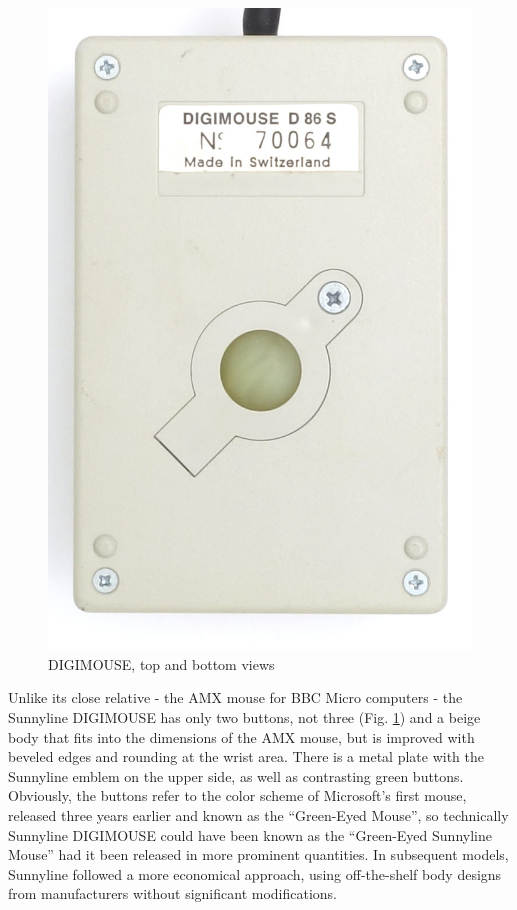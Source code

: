 \documentclass[11pt, a4paper]{article}
\begin{document}
\begin{figure}[h]
    \includegraphics[scale=0.85]{1986_sunnyline_digimouse/bottom_30.jpg}
    \caption{DIGIMOUSE, top and bottom views}
    \label{fig:SunnylineDIGIMOUSETopAndBottom}
\end{figure}

Unlike its close relative - the AMX mouse for BBC Micro computers - the Sunnyline DIGIMOUSE has only two buttons, not three (Fig. \ref{fig:SunnylineDIGIMOUSETopAndBottom}) and a beige body that fits into the dimensions of the AMX mouse, but is improved with beveled edges and rounding at the wrist area. There is a metal plate with the Sunnyline emblem on the upper side, as well as contrasting green buttons. Obviously, the buttons refer to the color scheme of Microsoft's first mouse, released three years earlier and known as the ``Green-Eyed Mouse'', so technically Sunnyline DIGIMOUSE could have been known as the ``Green-Eyed Sunnyline Mouse'' had it been released in more prominent quantities.
In subsequent models, Sunnyline followed a more economical approach, using off-the-shelf body designs from manufacturers without significant modifications.
\end{document}
